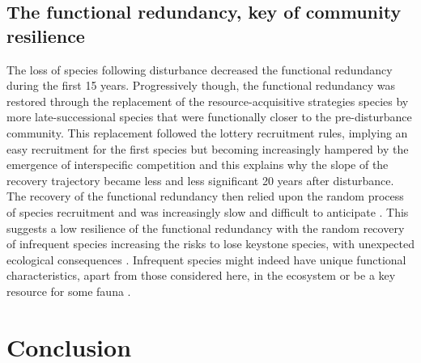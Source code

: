 \documentclass[fleqn,10pt]{ArtEcoFoG} %
\begin{document}
\subsection{The functional redundancy, key of community
resilience}\label{the-functional-redundancy-key-of-community-resilience}

The loss of species following disturbance decreased the functional
redundancy during the first 15 years. Progressively though, the
functional redundancy was restored through the replacement of the
resource-acquisitive strategies species by more late-successional
species that were functionally closer to the pre-disturbance community.
This replacement followed the lottery recruitment rules, implying an
easy recruitment for the first species but becoming increasingly
hampered by the emergence of interspecific competition
\citep{Busing2002} and this explains why the slope of the recovery
trajectory became less and less significant 20 years after disturbance.
The recovery of the functional redundancy then relied upon the random
process of species recruitment and was increasingly slow and difficult
to anticipate \citep{Elmqvist2003, Diaz2005}. This suggests a low
resilience of the functional redundancy with the random recovery of
infrequent species increasing the risks to lose keystone species, with
unexpected ecological consequences
\citep{Jones1994, Chazdon2003a, Diaz2005}. Infrequent species might
indeed have unique functional characteristics, apart from those
considered here, in the ecosystem or be a key resource for some fauna
\citep{Schleuning2016}.

\section{Conclusion}\label{conclusion}
\end{document}
